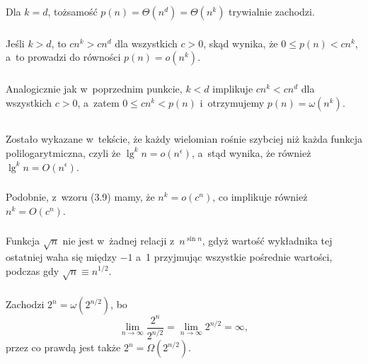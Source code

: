 \subsubsection{} %
Dla $k=d$, tożsamość $p(n)=\Theta(n^d)=\Theta(n^k)$ trywialnie zachodzi.

\subsubsection{} %
Jeśli $k>d$, to $cn^k>cn^d$ dla wszystkich $c>0$, skąd wynika, że $0\le p(n)<cn^k$, a~to prowadzi do równości $p(n)=o(n^k)$.

\subsubsection{} %
Analogicznie jak w~poprzednim punkcie, $k<d$ implikuje $cn^k<cn^d$ dla wszystkich $c>0$, a~zatem $0\le cn^k<p(n)$ i~otrzymujemy $p(n)=\omega(n^k)$.

\subsection{} %

\subsubsection{} %
Zostało wykazane w~tekście, że każdy wielomian rośnie szybciej niż każda funkcja polilogarytmiczna, czyli że $\lg^kn=o(n^\epsilon)$, a~stąd wynika, że również $\lg^kn=O(n^\epsilon)$.

\subsubsection{} %
Podobnie, z~wzoru (3.9) mamy, że $n^k=o(c^n)$, co implikuje również $n^k=O(c^n)$.

\subsubsection{} %
Funkcja $\sqrt{n}$ nie jest w~żadnej relacji z~$n^{\sin n}$, gdyż wartość wykładnika tej ostatniej waha się między $-1$ a~1 przyjmując wszystkie pośrednie wartości, podczas gdy $\sqrt{n}\equiv n^{1/2}$.

\subsubsection{} %
Zachodzi $2^n=\omega(2^{n/2})$, bo
\[
	\lim_{n\to\infty}\frac{2^n}{2^{n/2}} = \lim_{n\to\infty}2^{n/2} = \infty,
\]
przez co prawdą jest także $2^n=\Omega(2^{n/2})$.

